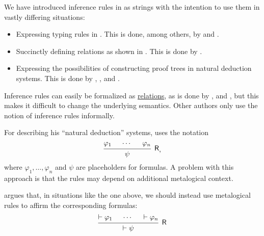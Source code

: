 \begin{remark}\label{rem:inference_rules_semantics}
  We have introduced inference rules in  as strings with the intention to use them in vastly differing situations:
  \begin{itemize}
    \item Expressing typing rules in . This is done, among others, by  and .
    \item Succinctly defining relations as shown in . This is done by .
    \item Expressing the possibilities of constructing proof trees in natural deduction systems. This is done by , ,  and .
  \end{itemize}

  Inference rules can easily be formalized as \hyperref[def:relation]{relations}, as is done by ,  and , but this makes it difficult to change the underlying semantics. Other authors only use the notion of inference rules informally.

  For describing his \enquote{natural deduction} systems,  uses the notation
  \begin{equation*}
    \begin{prooftree}
      \hypo{ \varphi_1 }
      \hypo{ \cdots }
      \hypo{ \varphi_n }
      \infer3[\logic{R}]{ \psi }
    \end{prooftree},
  \end{equation*}
  where \( \varphi_1, \ldots, \varphi_n \) and \( \psi \) are placeholders for formulas. A problem with this approach is that the rules may depend on additional metalogical context.

   argues that, in situations like the one above, we should instead use metalogical rules to affirm the corresponding formulas:
  \begin{equation*}
    \begin{prooftree}
      \hypo{ \vdash \varphi_1 }
      \hypo{ \cdots }
      \hypo{ \vdash \varphi_n }
      \infer3[\logic{R}]{ \vdash \psi }
    \end{prooftree}
  \end{equation*}


\end{remark}
